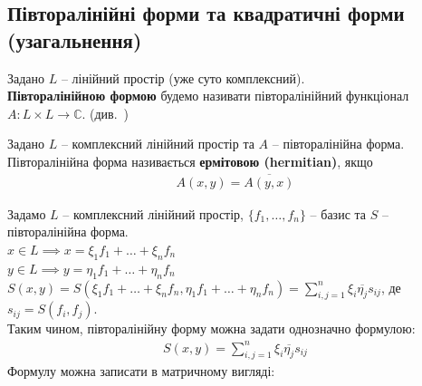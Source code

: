 \documentclass{math_library}
\begin{document}
\iffalse
\subsection{Півторалінійні форми та квадратичні форми (узагальнення)}
\begin{definition}
Задано $L$ -- лінійний простір (уже суто комплексний).\\
\textbf{Півторалінійною формою} будемо називати півторалінійний функціонал $A \colon L \times L \to \mathbb{C}$. (див.\ )
\end{definition}

\begin{definition}
Задано $L$ -- комплексний лінійний простір та $A$ -- півторалінійна форма.\\
Півторалінійна форма називається \textbf{ермітовою (hermitian)}, якщо
\begin{align*}
A(x,y) = \overline{A(y,x)}
\end{align*}
\end{definition}
\noindent
Задамо $L$ -- комплексний лінійний простір, $\{f_1,\dots,f_n\}$ -- базис та $S$ -- півторалінійна форма.\\
$x \in L \implies x = \xi_1 f_1 + \dots + \xi_n f_n$\\
$y \in L \implies y = \eta_1 f_1 + \dots + \eta_n f_n$\\
$S(x,y) = S(\xi_1 f_1 + \dots + \xi_n f_n, \eta_1 f_1 + \dots + \eta_n f_n) = \displaystyle\sum_{i,j=1}^n \xi_i \overline{\eta_j} s_{ij}$, де $s_{ij} = S(f_i,f_j)$.\\
Таким чином, півторалінійну форму можна задати однозначно формулою:
\begin{align*}
S(x,y) = \sum_{i,j=1}^n \xi_i \overline{\eta_j} s_{ij}
\end{align*}
Формулу можна записати в матричному вигляді:\\
\end{document}
